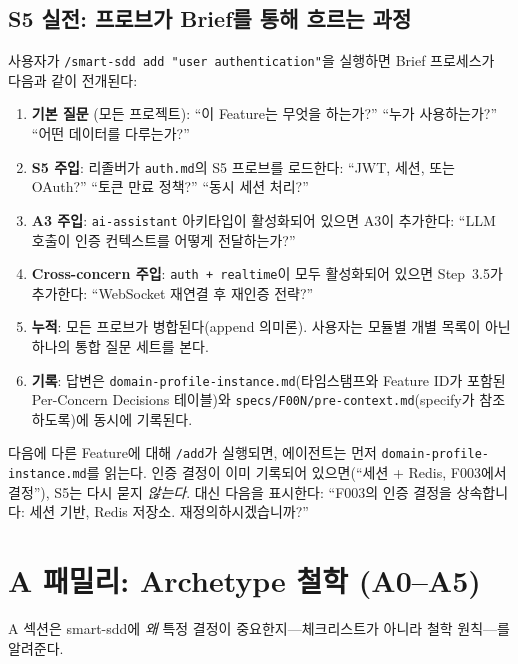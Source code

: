 \documentclass[11pt,a4paper,openright,twoside]{report}
\newcommand{\cmd}[1]{\texttt{/#1}}
\newcommand{\file}[1]{\texttt{#1}}
\begin{document}
\subsection{S5 실전: 프로브가 Brief를 통해 흐르는 과정}

사용자가 \cmd{smart-sdd add "user authentication"}을 실행하면 Brief 프로세스가 다음과 같이 전개된다:

\begin{enumerate}
  \item \textbf{기본 질문} (모든 프로젝트): ``이 Feature는 무엇을 하는가?'' ``누가 사용하는가?'' ``어떤 데이터를 다루는가?''
  \item \textbf{S5 주입}: 리졸버가 \texttt{auth.md}의 S5 프로브를 로드한다: ``JWT, 세션, 또는 OAuth?'' ``토큰 만료 정책?'' ``동시 세션 처리?''
  \item \textbf{A3 주입}: \texttt{ai-assistant} 아키타입이 활성화되어 있으면 A3이 추가한다: ``LLM 호출이 인증 컨텍스트를 어떻게 전달하는가?''
  \item \textbf{Cross-concern 주입}: \texttt{auth + realtime}이 모두 활성화되어 있으면 Step~3.5가 추가한다: ``WebSocket 재연결 후 재인증 전략?''
  \item \textbf{누적}: 모든 프로브가 병합된다(append 의미론). 사용자는 모듈별 개별 목록이 아닌 하나의 통합 질문 세트를 본다.
  \item \textbf{기록}: 답변은 \file{domain-profile-instance.md}(타임스탬프와 Feature ID가 포함된 Per-Concern Decisions 테이블)와 \file{specs/F00N/pre-context.md}(specify가 참조하도록)에 동시에 기록된다.
\end{enumerate}

다음에 다른 Feature에 대해 \cmd{add}가 실행되면, 에이전트는 먼저 \file{domain-profile-instance.md}를 읽는다. 인증 결정이 이미 기록되어 있으면(``세션 + Redis, F003에서 결정''), S5는 다시 묻지 \emph{않는다}. 대신 다음을 표시한다: ``F003의 인증 결정을 상속합니다: 세션 기반, Redis 저장소. 재정의하시겠습니까?''

\section{A 패밀리: Archetype 철학 (A0--A5)}

A 섹션은 smart-sdd에 \emph{왜} 특정 결정이 중요한지---체크리스트가 아니라 철학 원칙---를 알려준다.
\end{document}
